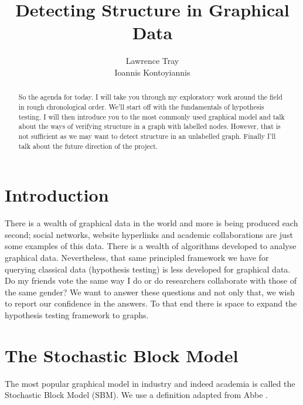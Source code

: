 \documentclass[]{article}
\title{Detecting Structure in Graphical Data}
\author{Lawrence Tray \\ Ioannis Kontoyiannis}
\begin{document}
\maketitle

\begin{abstract}
So the agenda for today. I will take you through my exploratory work around the field in rough chronological order. We’ll start off with the fundamentals of hypothesis testing. I will then introduce you to the most commonly used graphical model and talk about the ways of verifying structure in a graph with labelled nodes. However, that is not sufficient as we may want to detect structure in an unlabelled graph. Finally I’ll talk about the future direction of the project.
\end{abstract}

\tableofcontents

\section{Introduction}

There is a wealth of graphical data in the world and more is being produced each second; social networks, website hyperlinks and academic collaborations are just some examples of this data. There is a wealth of algorithms developed to analyse graphical data. Nevertheless, that same principled framework we have for querying classical data (hypothesis testing) is less developed for graphical data. Do my friends vote the same way I do or do researchers collaborate with those of the same gender? We want to answer these questions and not only that, we wish to report our confidence in the answers. To that end there is space to expand the hypothesis testing framework to graphs.

\section{The Stochastic Block Model}

The most popular graphical model in industry and indeed academia is called the Stochastic Block Model (SBM). We use a definition adapted from Abbe \cite{Abbe}.
\end{document}
